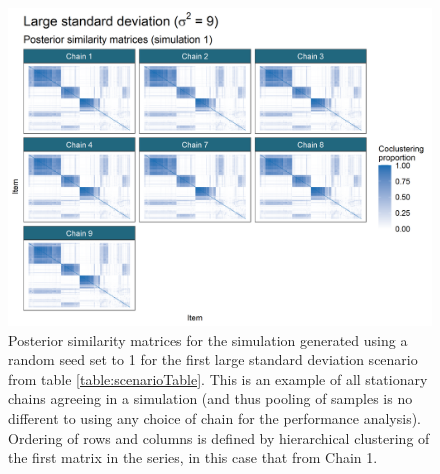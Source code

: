 \documentclass[]{article}
\begin{document}
\begin{figure} [!tpb]
	\centering
	\includegraphics[scale=0.65]{./Images/Simulations/PSMs/large_standard_deviation_3Sim1.png}
	\caption{Posterior similarity matrices for the simulation generated using a random seed set to 1 for the first large standard deviation scenario from table \ref{table:scenarioTable}. This is an example of all stationary chains agreeing in a simulation (and thus pooling of samples is no different to using any choice of chain for the performance analysis). Ordering of rows and columns is defined by hierarchical clustering of the first matrix in the series, in this case that from Chain 1.}
	\label{fig:simPSMsAgreeExample}
\end{figure}
\end{document}

